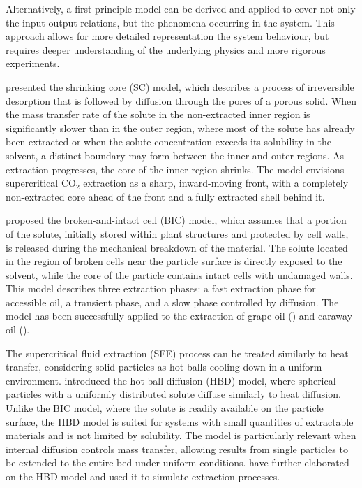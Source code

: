 \documentclass[../Article_Model_Parameters.tex]{subfiles}
\begin{document}
	Alternatively, a first principle model can be derived and applied to cover not only the input-output relations, but the phenomena occurring in the system. This approach allows for more detailed representation the system behaviour, but requires deeper understanding of the underlying physics and more rigorous experiments.
	
	\citet{Goto1996} presented the shrinking core (SC) model, which describes a process of irreversible desorption that is followed by diffusion through the pores of a porous solid. When the mass transfer rate of the solute in the non-extracted inner region is significantly slower than in the outer region, where most of the solute has already been extracted or when the solute concentration exceeds its solubility in the solvent, a distinct boundary may form between the inner and outer regions. As extraction progresses, the core of the inner region shrinks. The model envisions supercritical CO$_2$ extraction as a sharp, inward-moving front, with a completely non-extracted core ahead of the front and a fully extracted shell behind it.
	
	\citet{Sovova1994} proposed the broken-and-intact cell (BIC) model, which assumes that a portion of the solute, initially stored within plant structures and protected by cell walls, is released during the mechanical breakdown of the material. The solute located in the region of broken cells near the particle surface is directly exposed to the solvent, while the core of the particle contains intact cells with undamaged walls. This model describes three extraction phases: a fast extraction phase for accessible oil, a transient phase, and a slow phase controlled by diffusion. The model has been successfully applied to the extraction of grape oil (\citet{Sovova1994b}) and caraway oil (\citet{Sovova1994a}).
	
	The supercritical fluid extraction (SFE) process can be treated similarly to heat transfer, considering solid particles as hot balls cooling down in a uniform environment. \citet{Bartle1990} introduced the hot ball diffusion (HBD) model, where spherical particles with a uniformly distributed solute diffuse similarly to heat diffusion. Unlike the BIC model, where the solute is readily available on the particle surface, the HBD model is suited for systems with small quantities of extractable materials and is not limited by solubility. The model is particularly relevant when internal diffusion controls mass transfer, allowing results from single particles to be extended to the entire bed under uniform conditions. \citet{Reverchon1993} have further elaborated on the HBD model and used it to simulate extraction processes.
	
\end{document}
